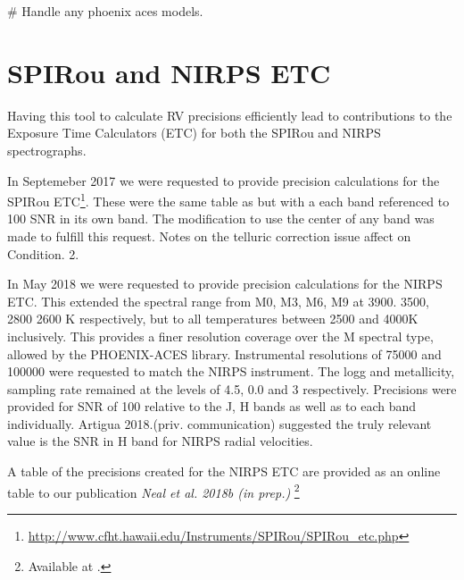\# Handle any phoenix aces models.


\section{SPIRou and NIRPS ETC}
Having this tool to calculate RV precisions efficiently lead to contributions to the Exposure Time Calculators (ETC) for both the SPIRou and NIRPS spectrographs.

In Septemeber 2017 we were requested to provide precision calculations for the SPIRou ETC\footnote{\url{http://www.cfht.hawaii.edu/Instruments/SPIRou/SPIRou_etc.php}}. These were the same table as \citet{figueira_radial_2016} but with a each band referenced to 100 SNR in its own band. The modification to use the center of any band was made to fulfill this request. Notes on the telluric correction issue affect on Condition. 2.  

In May 2018 we were requested to provide precision calculations for the NIRPS ETC. This extended the spectral range from M0, M3, M6, M9 at 3900. 3500, 2800 2600 K respectively, but to all temperatures between 2500 and 4000K inclusively. This provides a finer resolution coverage over the M spectral type, allowed by the PHOENIX-ACES library.
Instrumental resolutions of 75000 and 100000 were requested to match the NIRPS instrument.
The logg and metallicity, sampling rate remained at the \citet{figueira_radial_2016} levels of 4.5, 0.0 and 3 respectively.
Precisions were provided for SNR of 100 relative to the J, H bands as well as to each band individually. Artigua 2018.(priv. communication) suggested the truly relevant value is the SNR in H band for NIRPS radial velocities.

A table of the precisions created for the NIRPS ETC are provided as an online table to our publication \textit{Neal et al. 2018b (in prep.)} \footnote{Available at \url{}.}  

